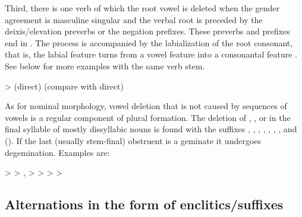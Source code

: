Third, there is one verb of which the root vowel  is deleted when the gender agreement is masculine singular and the verbal root is preceded by the deixis/elevation preverbs or the negation prefixes. These preverbs and prefixes end in . The process is accompanied by the labialization of the root consonant, that is, the labial feature turns from a vowel feature into a consonantal feature . See  below for more examples with the same verb stem.
%
\begin{exe}
	\ex	{} >  \newline\hspace*{1em}(direct) (compare with  direct)	\label{ex:habulqan phon}
\end{exe}

As for nominal morphology, vowel deletion that is not caused by sequences of vowels is a regular component of plural formation. The deletion of , , or  in the final syllable of mostly dissyllabic nouns is found with the suffixes , , , , , , , and  (). If the last (usually stem-final) obstruent is a geminate it undergoes degemination. Examples are:
%
\begin{exe}
	\ex	\label{ex:vowel syncope nouns phon}
	\begin{xlist}
		\ex	{} >  
		\ex	{} >  ,
		\ex	{} >  
		\ex	{} >  
		\ex	{} >  
		\ex	{} >  
	\end{xlist}
\end{exe}



\subsection{Alternations in the form of enclitics\slash suffixes}
\label{ssec:Alternations in the form of enclitics / suffixes}


